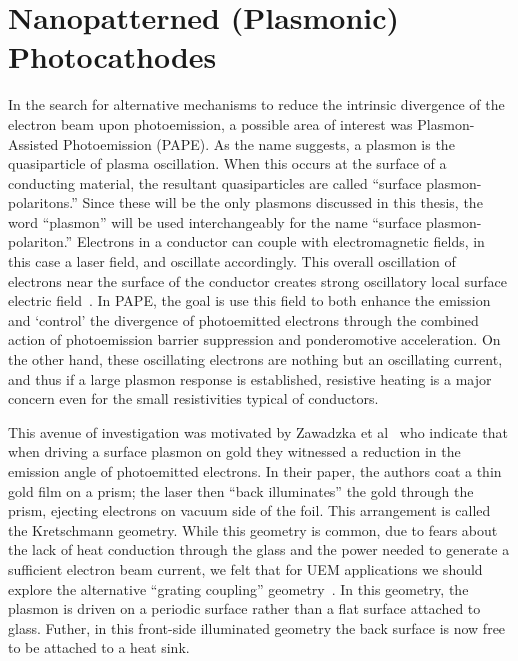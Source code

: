 
\section{Nanopatterned (Plasmonic) Photocathodes}

In the search for alternative mechanisms to reduce the intrinsic divergence of the electron beam upon photoemission, a possible area of interest was Plasmon-Assisted Photoemission (PAPE). 
As the name suggests, a plasmon is the quasiparticle of plasma oscillation.
When this occurs at the surface of a conducting material, the resultant quasiparticles are called ``surface plasmon-polaritons.''
Since these will be the only plasmons discussed in this thesis, the word ``plasmon'' will be used interchangeably for the name ``surface plasmon-polariton.''
Electrons in a conductor can couple with electromagnetic fields, in this case a laser field, and oscillate accordingly.
This overall oscillation of electrons near the surface of the conductor creates strong oscillatory local surface electric field~\cite{cottam_introduction_2004,concepts_2002}.
In PAPE, the goal is use this field to both enhance the emission and `control' the divergence of photoemitted electrons through the combined action of photoemission barrier suppression and ponderomotive acceleration.
On the other hand, these oscillating electrons are nothing but an oscillating current, and thus if a large plasmon response is established, resistive heating is a major concern even for the small resistivities typical of conductors.

This avenue of investigation was motivated by Zawadzka et al~\cite{zawadzka_evanescent_2001} who indicate that when driving a surface plasmon on gold they witnessed a reduction in the emission angle of photoemitted electrons.
In their paper, the authors coat a thin gold film on a prism; the laser then ``back illuminates'' the gold through the prism, ejecting electrons on vacuum side of the foil.
This arrangement is called the Kretschmann geometry.
While this geometry is common, due to fears about the lack of heat conduction through the glass and the power needed to generate a sufficient electron beam current, we felt that for UEM applications we should explore the alternative ``grating coupling'' geometry~\cite{kupersztych_ponderomotive_2001,kupersztych_anomalous_2005,li_surface_2013}.
In this geometry, the plasmon is driven on a periodic surface rather than a flat surface attached to glass.
Futher, in this front-side illuminated geometry the back surface is now free to be attached to a heat sink.

